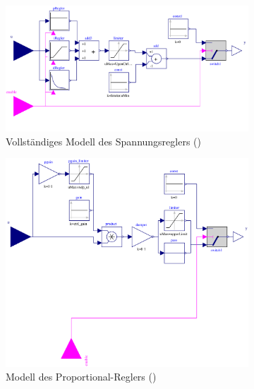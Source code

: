 \begin{figure}
    \centering
    \begin{subfigure}{.49\textwidth}
	    \includegraphics{Bilder/Spannungsregler.pdf}
		\caption{Vollständiges Modell des Spannungsreglers ()}
		\label{fig:Spannungsregler-Modell}    	
    \end{subfigure}
    \begin{subfigure}{.49\textwidth}
		\includegraphics{Bilder/PRegler.pdf}
		\caption{Modell des Proportional-Reglers ()}
		\label{fig:P-Regler}
    \end{subfigure}
    \begin{subfigure}{.49\textwidth}

\end{subfigure}
\end{figure}
